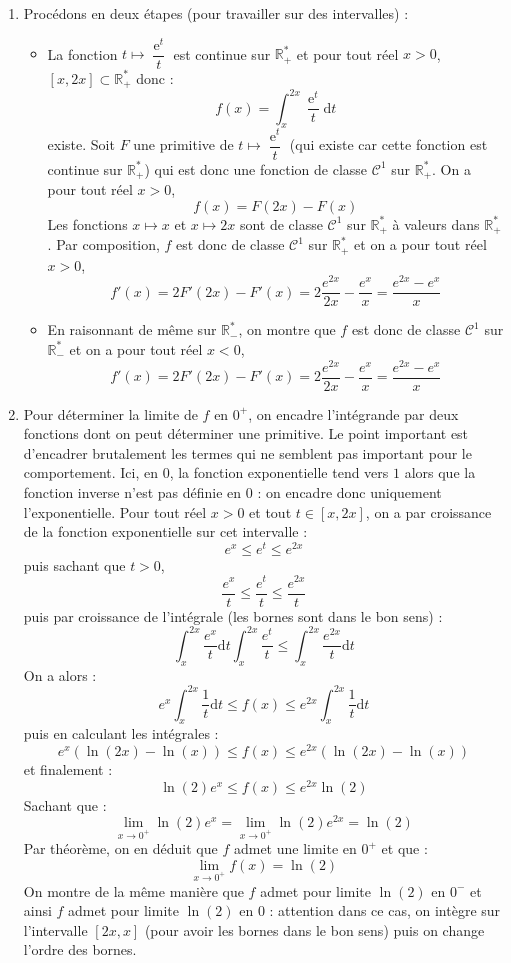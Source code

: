 \documentclass[french,11pt,twoside]{VcCours}
\newcommand{\dt}{\text{d}t}
\DeclareMathOperator{\e}{e}
\begin{document}
\begin{enumerate}
  \item Procédons en deux étapes (pour travailler sur des intervalles) :
  
 \begin{itemize}
 \item La fonction $t \mapsto \dfrac{\e^{t}}{t}$ est continue sur $\mathbb{R}_+^{*}$ et pour tout réel $x>0$, $[x,2x] \subset \mathbb{R}_+^{*}$ donc :
 $$ f(x) = \int_{x}^{2x} \frac{\e^{t}}{t} \dt$$
existe. Soit $F$ une primitive de $t \mapsto \dfrac{\e^{t}}{t}$ (qui existe car cette fonction est continue sur $\mathbb{R}_+^{*}$) qui est donc une fonction de classe $\mathcal{C}^1$ sur $\mathbb{R}_{+}^{*}$. On a pour tout réel $x>0$,
$$ f(x) = F(2x)-F(x)$$
Les fonctions $x \mapsto x$ et $x \mapsto 2x$ sont de classe $\mathcal{C}^1$ sur $\mathbb{R}_+^{*}$ à valeurs dans $\mathbb{R}_+^{*}$. Par composition, $f$ est donc de classe $\mathcal{C}^1$ sur $\mathbb{R}_+^{*}$ et on a pour tout réel $x>0$,
$$ f'(x) = 2F'(2x)-F'(x) = 2 \dfrac{e^{2x}}{2x}- \dfrac{e^x}{x} = \dfrac{e^{2x}-e^x}{x}$$
 \item En raisonnant de même sur $\mathbb{R}_{-}^{*}$, on montre que $f$ est donc de classe $\mathcal{C}^1$ sur $\mathbb{R}_{-}^{*}$ et on a pour tout réel $x<0$,
$$ f'(x) = 2F'(2x)-F'(x) = 2 \dfrac{e^{2x}}{2x}- \dfrac{e^x}{x} = \dfrac{e^{2x}-e^x}{x}$$
\end{itemize}
  \item Pour déterminer la limite de $f$ en $0^{+}$, on encadre l'intégrande  par deux fonctions dont on peut déterminer une primitive. Le point important est d'encadrer \og brutalement \fg les termes qui ne semblent pas important pour le comportement. Ici, en $0$, la fonction exponentielle tend vers $1$ alors que la fonction inverse n'est pas définie en $0$ : on encadre donc uniquement l'exponentielle. Pour tout réel $x>0$ et tout $t \in [x,2x]$, on a par croissance de la fonction exponentielle sur cet intervalle :
  $$ e^{x} \leq e^t \leq e^{2x}$$
  puis sachant que $t>0$,
  $$ \dfrac{e^x}{t} \leq \frac{e^t}{t} \leq \frac{e^{2x}}{t}$$
  puis par croissance de l'intégrale (les bornes sont dans le bon sens) :
  $$ \int_{x}^{2x}  \dfrac{e^x}{t} \dt \int_{x}^{2x}  \frac{e^t}{t} \leq  \int_{x}^{2x}  \frac{e^{2x}}{t} \dt$$
On a alors :
$$ e^x  \int_{x}^{2x}  \dfrac{1}{t} \dt \leq f(x) \leq  e^{2x} \int_{x}^{2x}  \frac{1}{t} \dt$$
puis en calculant les intégrales :
$$ e^x (\ln(2x)-\ln(x)) \leq f(x) \leq e^{2x} (\ln(2x)-\ln(x))$$
et finalement :
$$ \ln(2) e^{x} \leq f(x) \leq e^{2x} \ln(2) $$
Sachant que :
$$ \lim_{x \rightarrow 0^+} \ln(2) e^{x} =  \lim_{x \rightarrow 0^+} \ln(2) e^{2x} = \ln(2)$$
Par théorème, on en déduit que $f$ admet une limite en $0^+$ et que :
$$ \lim_{x \rightarrow 0^+} f(x) = \ln(2)$$
On montre de la même manière que $f$ admet pour limite $\ln(2)$ en $0^{-}$ et ainsi $f$ admet pour limite $\ln(2)$ en $0$ : attention dans ce cas, on intègre sur l'intervalle $[2x,x]$ (pour avoir les bornes dans le bon sens) puis on change l'ordre des bornes. 
\end{enumerate} 
\end{document}
